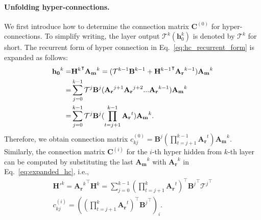 \paragraph{Unfolding hyper-connections.}
We first introduce how to determine the connection matrix $\mathbf{C}^{(0)}$ for hyper-connections. To simplify writing, the layer output $\mathcal{T}^{k}(\mathbf{h}_0^{k})$ is denoted by $\mathcal{T}^{k}$ for short. The recurrent form of hyper connection in Eq.~\ref{eq:hc_recurrent_form} is expanded as follows:
\begin{align}
    {\mathbf{h_0}^{k}}=&{\mathbf{H}^{k}}^\intercal \mathbf{A_m}^{k}
    =(\mathcal{T}^{k-1}\mathbf{B}^{k-1} + {\mathbf{H}^{k-1}}^\intercal \mathbf{A_r}^{k-1} )\mathbf{A_m}^{k} \notag\\
    =& \sum_{j=0}^{k-1}\mathcal{T}^j\mathbf{B}^j(\mathbf{A_r}^{j+1}\mathbf{A_r}^{j+2} ... \mathbf{A_{r}}^{k-1})\mathbf{A_m}^{k} \notag \\
    =& \sum_{j=0}^{k-1}\mathcal{T}^j\mathbf{B}^j(\prod_{t=j+1}^{k-1}{\mathbf{A_r}^t})\mathbf{A_m}^{k}. \label{eq:expanded_hc}
\end{align}
Therefore, we obtain connection matrix $c^{(0)}_{kj}=\mathbf{B}^j(\prod_{t=j+1}^{k-1}{\mathbf{A_r}^t})\mathbf{A_m}^{k}$. Similarly, the connection matrix $\mathbf{C}^{(i)}$ for the $i$-th hyper hidden from $k$-th layer can be computed by substituting the last ${\mathbf{A_m}^{k}}$ with $\mathbf{A_r}^{k}$ in Eq.~\ref{eq:expanded_hc}, i.e., 
\begin{gather}
{\mathbf{H'}^{k}}={\mathbf{A_r}^{k}}^\intercal \mathbf{H}^{k}=\sum_{j=0}^{k-1}(\prod_{t=j+1}^{k}{\mathbf{A_r}^t})^\intercal {\mathbf{B}^j}^\intercal {\mathcal{T}^j}^\intercal\\
c^{(i)}_{kj}=\left({(\prod_{t=j+1}^{k}{\mathbf{A_r}^t})}^\intercal {\mathbf{B}^j}^\intercal\right)_{i}.
\end{gather}


